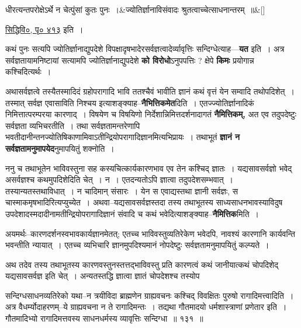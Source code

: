 \documentclass[article,12pt,a4paper]{memoir}
\begin{document}
	  \bigskip
	  \begingroup
	
	    
	    \stanza[\smallbreak]
	धीरत्यन्तपरोक्षेऽर्थे न चेत्पुंसां कुतः पुनः ।&ज्योतिर्ज्ञानाविसंवादः श्रुतत्वाच्चेत्साधनान्तरम् ॥\&[\smallbreak]


	\href{http://sarit.indology.info/?cref=svi.p413}{सिद्धिवि०, पृ० ४१३} इति ।
	  \endgroup
	

	  \pstart कथं पुनः सत्यपि ज्योतिर्ज्ञानाद्युपदेशे विपक्षादृषभादेरसर्वज्ञत्वादेर्व्यावृत्तिः सन्दिग्धेत्याह—\textbf{यत} इति । अत्र सर्वज्ञतायामनिष्टायां सत्यामपि ज्योतिर्ज्ञानाद्युपदेशे \textbf{को विरोधो}ऽनुपपत्तिः ? क्षेपे \textbf{किमः} प्रयोगान्न कश्चिदित्यर्थः ।
	\pend
      

	  \pstart अथासर्वज्ञत्वे तस्यैतस्मादिदं ग्रहोपरागादि भावि ततश्चैवं भावीति ज्ञानं कथं वृत्तं येन सम्वादि तथोपदिशेत् । तस्मात् सर्वज्ञ एवासाविति निश्चय इत्याशङ्क्याह--\textbf{नैभित्तिकमेत}दिति । एतज्ज्योतिर्ज्ञानादिकं निमित्तात्परम्परया कारणाद् । विषयेण च विषयिणो निर्देशान्निमित्तदर्शनादागतं \textbf{नैमित्तिकम्,} अत एव तदुपदेष्टुः सर्वज्ञता व्यभिचरतीति । तथा सर्वज्ञतामन्तरेणापि भवतीदानीन्तनज्योतिषिकाणामिवाऽतीन्द्रियोपरागादिज्ञानमित्यभिप्रायः । तथाभूतं \textbf{ज्ञानं न सर्वज्ञतामनुमापयेद}नुमापयितुं शक्नोति ।
	\pend
      

	  \pstart ननु च तथाभूतेन भाविवस्तुना सह कस्यचित्कार्यकारणभाव एव तेन कश्चिद् ज्ञातः । यद्य\leavevmode{}सावसर्वज्ञो भवेद् असर्वज्ञश्च कथमुपदिशेदिति चेत् । न । एतदन्यतोऽपि ज्ञात्वा तदुपदेशसम्भवात् । तस्यान्यतस्तथाविधात् । न चादिमान् संसारः । येन स एवाद्यस्तथा ज्ञानी सर्वज्ञः, स चास्माकमृषभादिरित्यप्युच्येत । अथवा--यद्यसावसर्वज्ञस्तदा तस्य तथाभूतस्य साध्यसाधनभावस्याविदुष उपदेशादस्मदादीनामतीन्द्रियोपरागादिज्ञानं संवादि च कथं भवेदित्याशङ्क्याह--\textbf{नैमित्तिक}मिति ।
	\pend
      

	  \pstart अयमर्थः--कारणदर्शनस्वभावकार्यज्ञानमेतत्; एतच्च भाविवस्तुव्यतिरेकेण भवेदपि, नावश्यं कारणानि कार्यवन्ति भवन्तीति न्यायात् । एतच्च व्यभिचारि ज्ञानमुपदिश्यमानं नोपदेष्टुः सर्वज्ञतामनुमापयितुं कल्प्यते ।
	\pend
      

	  \pstart अथ तदेव तस्य तथाभूतस्य कारणवस्तुनस्तत्तद्भाविवस्तु प्रति कारणत्वं कथं जानीयात्कथं चोपदिशेद् यद्यसावसर्वज्ञ इति चेत् । अन्यतस्तद्धि ज्ञात्वा ज्ञातं  चोपदेशश्च तस्योप  \leavevmode{} 
	  
	सन्दिग्धसाधनव्यतिरेको यथा--न त्रयीविदा ब्राह्मणेन ग्राह्यवचनः कश्चिद् विवक्षितः पुरुषो रागादिमत्त्वादिति । अत्र वैधर्म्योदाहरणम्--ये ग्राह्यवचना न ते रागादिमन्तः । तद्यथा गौतमादयो धर्मशास्त्राणां प्रणेतार इति । गौतमादिभ्यो रागादिमत्तवस्य साधनधर्मस्य व्यावृत्तिः सन्दिग्धा ॥ १३१ ॥   
	  
\end{document}
